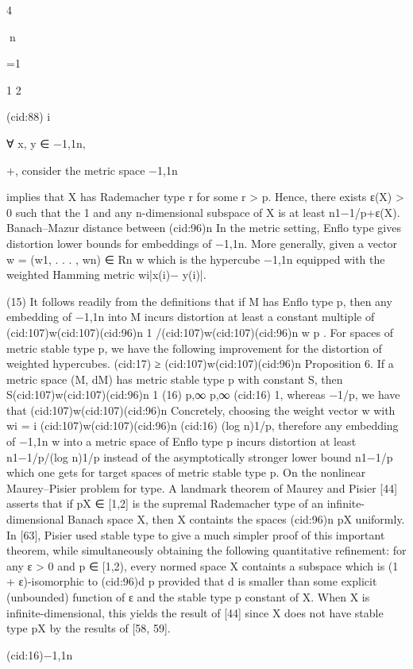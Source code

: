 4

n

=1

1 2

(cid:88) i

∀ x, y ∈ {−1,1}n,

+, consider the metric space {−1,1}n

implies that X has Rademacher type r for some r > p. Hence, there exists ε(X) > 0 such that the
1 and any n-dimensional subspace of X is at least n1−1/p+ε(X).
Banach–Mazur distance between (cid:96)n
In the metric setting, Enﬂo type gives distortion lower bounds for embeddings of {−1,1}n.
More generally, given a vector w = (w1, . . . , wn) ∈ Rn
w which
is the hypercube {−1,1}n equipped with the weighted Hamming metric
wi|x(i)− y(i)|.

(15)
It follows readily from the deﬁnitions that if M has Enﬂo type p, then any embedding of {−1,1}n
into M incurs distortion at least a constant multiple of (cid:107)w(cid:107)(cid:96)n
1 /(cid:107)w(cid:107)(cid:96)n
w
p . For spaces of metric stable
type p, we have the following improvement for the distortion of weighted hypercubes.
(cid:17) ≥ (cid:107)w(cid:107)(cid:96)n
Proposition 6. If a metric space (M, dM) has metric stable type p with constant S, then
S(cid:107)w(cid:107)(cid:96)n
1
(16)
p,∞
p,∞ (cid:16) 1, whereas
−1/p, we have that (cid:107)w(cid:107)(cid:96)n
Concretely, choosing the weight vector w with wi = i
(cid:107)w(cid:107)(cid:96)n
(cid:16) (log n)1/p, therefore any embedding of {−1,1}n
w into a metric space of Enﬂo type p
incurs distortion at least n1−1/p/(log n)1/p instead of the asymptotically stronger lower bound
n1−1/p which one gets for target spaces of metric stable type p.
On the nonlinear Maurey–Pisier problem for type. A landmark theorem of Maurey and Pisier [44]
asserts that if pX ∈ [1,2] is the supremal Rademacher type of an inﬁnite-dimensional Banach
space X, then X containts the spaces (cid:96)n
pX uniformly. In [63], Pisier used stable type to give a
much simpler proof of this important theorem, while simultaneously obtaining the following
quantitative reﬁnement: for any ε > 0 and p ∈ [1,2), every normed space X containts a subspace
which is (1 + ε)-isomorphic to (cid:96)d
p provided that d is smaller than some explicit (unbounded)
function of ε and the stable type p constant of X. When X is inﬁnite-dimensional, this yields
the result of [44] since X does not have stable type pX by the results of [58, 59].

(cid:16){−1,1}n


